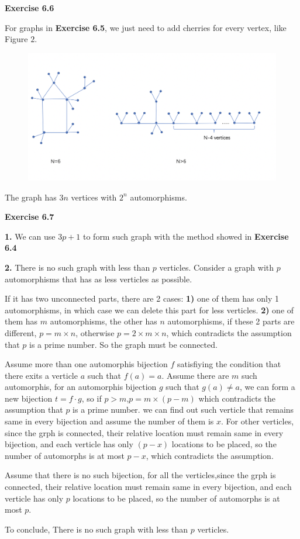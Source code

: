 \documentclass{article} %
\begin{document}
	\textbf{Exercise 6.6}\par
	For graphs in \textbf{Exercise 6.5}, we just need to add cherries for every vertex, like Figure $2$.
	\begin{figure}[H]
  	\centering
  	\includegraphics[scale=0.4]{66.png}
  	\caption{}
  	\label{fig:7}
  	\end{figure}
	The graph has $3n$ vertices with $2^{n}$ automorphisms.\par
	\textbf{Exercise 6.7}\par
	\textbf{1.} We can use $3p+1$ to form such graph with the method showed in \textbf{Exercise 6.4}\par
	\textbf{2.} There is no such graph with less than $p$ verticles. Consider a graph with $p$ automorphisms that has as less verticles as possible.\par 
	If it has two unconnected parts, there are 2 cases: \textbf{1)} one of them has only 1 automorphisms, in which case we can delete this part for less verticles. \textbf{2)} one of them has $m$  automorphisms, the other has $n$ automorphisms, if these 2 parts are different, $p=m \times n$, otherwise $p=2\times m\times n$, which contradicts the assumption that $p$ is a prime number. So the graph must be connected.\par 
	Assume more than one automorphis bijection $f$ satisfiying the condition that there exits a verticle $a$ such that $f(a)=a$. Assume there are $m$ such automorphis, for an automorphis bijection $g$ such that $g(a) \not=a$, we can form a new bijection $t=f \cdot g$, so if $p>m$,$p=m\times (p-m) $  
	which contradicts the assumption that $p$ is a prime number. we can find out such verticle that remains same in every bijection and assume the number of them is $x$. For other verticles, since the grph is connected, their relative location must remain same in every bijection, and each verticle has only $(p-x)$ locations to be placed, so the number of automorphs is at most $p-x$, which contradicts the assumption. \par
	Assume that there is no such bijection, for all the verticles,since the grph is connected, their relative location must remain same in every bijection, and each verticle has only $p$ locations to be placed, so the number of automorphs is at most $p$.\par
	To conclude, There is no such graph with less than $p$ verticles.	\par
\end{document}

